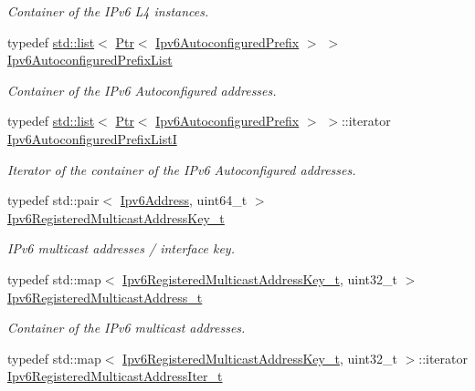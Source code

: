 \begin{DoxyCompactItemize}
\begin{DoxyCompactList}\small\item\em Container of the I\+Pv6 L4 instances. \end{DoxyCompactList}\item 
typedef \hyperlink{openflow-interface_8h_afd9bcfa176617760671b67580f536fa7}{std\+::list}$<$ \hyperlink{classns3_1_1Ptr}{Ptr}$<$ \hyperlink{classns3_1_1Ipv6AutoconfiguredPrefix}{Ipv6\+Autoconfigured\+Prefix} $>$ $>$ \hyperlink{classns3_1_1Ipv6L3Protocol_a9da53420c273775a4a089b4d2273e38f}{Ipv6\+Autoconfigured\+Prefix\+List}
\begin{DoxyCompactList}\small\item\em Container of the I\+Pv6 Autoconfigured addresses. \end{DoxyCompactList}\item 
typedef \hyperlink{openflow-interface_8h_afd9bcfa176617760671b67580f536fa7}{std\+::list}$<$ \hyperlink{classns3_1_1Ptr}{Ptr}$<$ \hyperlink{classns3_1_1Ipv6AutoconfiguredPrefix}{Ipv6\+Autoconfigured\+Prefix} $>$ $>$\+::iterator \hyperlink{classns3_1_1Ipv6L3Protocol_af00957df9fbda1b1427ad41dd788b99a}{Ipv6\+Autoconfigured\+Prefix\+ListI}
\begin{DoxyCompactList}\small\item\em Iterator of the container of the I\+Pv6 Autoconfigured addresses. \end{DoxyCompactList}\item 
typedef std\+::pair$<$ \hyperlink{classns3_1_1Ipv6Address}{Ipv6\+Address}, uint64\+\_\+t $>$ \hyperlink{classns3_1_1Ipv6L3Protocol_ad85035c0604805049efdc7a5b3d99082}{Ipv6\+Registered\+Multicast\+Address\+Key\+\_\+t}
\begin{DoxyCompactList}\small\item\em I\+Pv6 multicast addresses / interface key. \end{DoxyCompactList}\item 
typedef std\+::map$<$ \hyperlink{classns3_1_1Ipv6L3Protocol_ad85035c0604805049efdc7a5b3d99082}{Ipv6\+Registered\+Multicast\+Address\+Key\+\_\+t}, uint32\+\_\+t $>$ \hyperlink{classns3_1_1Ipv6L3Protocol_a42035d08aa8b69e38952370622db7f80}{Ipv6\+Registered\+Multicast\+Address\+\_\+t}
\begin{DoxyCompactList}\small\item\em Container of the I\+Pv6 multicast addresses. \end{DoxyCompactList}\item 
typedef std\+::map$<$ \hyperlink{classns3_1_1Ipv6L3Protocol_ad85035c0604805049efdc7a5b3d99082}{Ipv6\+Registered\+Multicast\+Address\+Key\+\_\+t}, uint32\+\_\+t $>$\+::iterator \hyperlink{classns3_1_1Ipv6L3Protocol_aaa04da26fa5428e033aae963d54185fd}{Ipv6\+Registered\+Multicast\+Address\+Iter\+\_\+t}

\end{DoxyCompactItemize}
